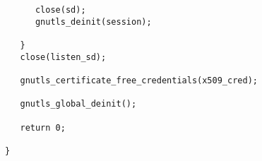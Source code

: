 \begin{verbatim}
      close(sd);
      gnutls_deinit(session);

   }
   close(listen_sd);

   gnutls_certificate_free_credentials(x509_cred);

   gnutls_global_deinit();

   return 0;

}

\end{verbatim}

